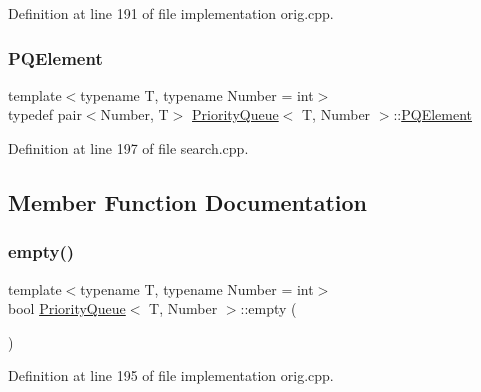 Definition at line 191 of file implementation orig.\+cpp.

\mbox{\label{struct_priority_queue_ae86a19aae3f9a32a1d76dfdab34eb70b}} 
\subsubsection{\texorpdfstring{P\+Q\+Element}{PQElement}\hspace{0.1cm}{\footnotesize\ttfamily [2/2]}}
{\footnotesize\ttfamily template$<$typename T, typename Number = int$>$ \\
typedef pair$<$Number, T$>$ \hyperlink{struct_priority_queue}{Priority\+Queue}$<$ T, Number $>$\+::\hyperlink{struct_priority_queue_ae86a19aae3f9a32a1d76dfdab34eb70b}{P\+Q\+Element}}



Definition at line 197 of file search.\+cpp.



\subsection{Member Function Documentation}
\mbox{\label{struct_priority_queue_a422e38d0c3b8398dc6e4867bb4ceec41}} 
\subsubsection{\texorpdfstring{empty()}{empty()}\hspace{0.1cm}{\footnotesize\ttfamily [1/2]}}
{\footnotesize\ttfamily template$<$typename T, typename Number = int$>$ \\
bool \hyperlink{struct_priority_queue}{Priority\+Queue}$<$ T, Number $>$\+::empty (\begin{DoxyParamCaption}{ }\end{DoxyParamCaption})\hspace{0.3cm}{\ttfamily [inline]}}



Definition at line 195 of file implementation orig.\+cpp.

